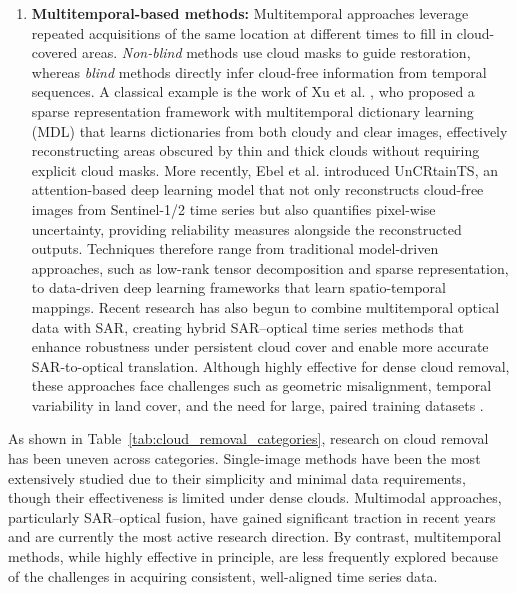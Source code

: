 \begin{enumerate}[label=(\Alph*)]
  \item \textbf{Multitemporal-based methods:} Multitemporal approaches leverage repeated acquisitions of the same location at different times to fill in cloud-covered areas. \textit{Non-blind} methods use cloud masks to guide restoration, whereas \textit{blind} methods directly infer cloud-free information from temporal sequences. A classical example is the work of Xu et al. \cite{CR_spars_repre_MT_dict_L}, who proposed a sparse representation framework with multitemporal dictionary learning (MDL) that learns dictionaries from both cloudy and clear images, effectively reconstructing areas obscured by thin and thick clouds without requiring explicit cloud masks. More recently, Ebel et al. \cite{UnCRtainTS} introduced UnCRtainTS, an attention-based deep learning model that not only reconstructs cloud-free images from Sentinel-1/2 time series but also quantifies pixel-wise uncertainty, providing reliability measures alongside the reconstructed outputs. Techniques therefore range from traditional model-driven approaches, such as low-rank tensor decomposition and sparse representation, to data-driven deep learning frameworks that learn spatio-temporal mappings. Recent research has also begun to combine multitemporal optical data with SAR, creating hybrid SAR–optical time series methods that enhance robustness under persistent cloud cover and enable more accurate SAR-to-optical translation. Although highly effective for dense cloud removal, these approaches face challenges such as geometric misalignment, temporal variability in land cover, and the need for large, paired training datasets \cite{CR_Advances_Review_ORS}.

\end{enumerate}

As shown in Table~\ref{tab:cloud_removal_categories}, research on cloud removal has been uneven across categories. Single-image methods have been the most extensively studied due to their simplicity and minimal data requirements, though their effectiveness is limited under dense clouds. Multimodal approaches, particularly SAR–optical fusion, have gained significant traction in recent years and are currently the most active research direction. By contrast, multitemporal methods, while highly effective in principle, are less frequently explored because of the challenges in acquiring consistent, well-aligned time series data.

